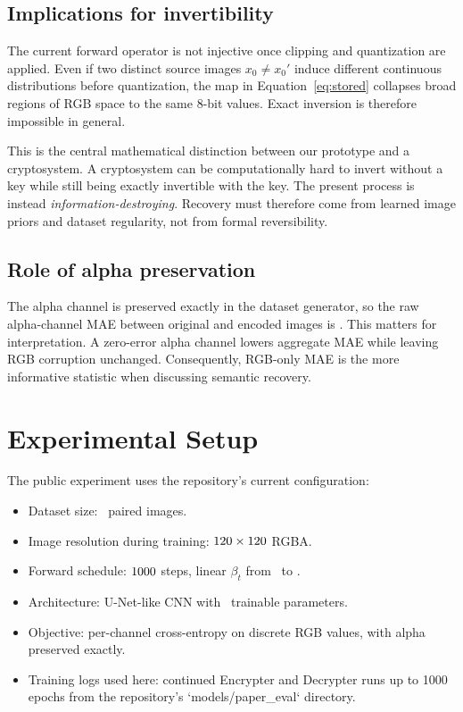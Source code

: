 \documentclass[11pt]{article}
\begin{document}
\subsection{Implications for invertibility}
The current forward operator is not injective once clipping and quantization are applied. Even if two distinct source images $x_0 \neq x_0'$ induce different continuous distributions before quantization, the map in Equation~\eqref{eq:stored} collapses broad regions of RGB space to the same 8-bit values. Exact inversion is therefore impossible in general.

This is the central mathematical distinction between our prototype and a cryptosystem. A cryptosystem can be computationally hard to invert without a key while still being exactly invertible with the key. The present process is instead \emph{information-destroying}. Recovery must therefore come from learned image priors and dataset regularity, not from formal reversibility.

\subsection{Role of alpha preservation}
The alpha channel is preserved exactly in the dataset generator, so the raw alpha-channel MAE between original and encoded images is \RawAlphaMAE. This matters for interpretation. A zero-error alpha channel lowers aggregate MAE while leaving RGB corruption unchanged. Consequently, RGB-only MAE is the more informative statistic when discussing semantic recovery.

\section{Experimental Setup}
The public experiment uses the repository's current configuration:
\begin{itemize}
    \item Dataset size: \NumPairs\ paired images.
    \item Image resolution during training: $120 \times 120$ RGBA.
    \item Forward schedule: $1000$ steps, linear $\beta_t$ from \BetaStart\ to \BetaEnd.
    \item Architecture: U-Net-like CNN with \ModelParamCount\ trainable parameters.
    \item Objective: per-channel cross-entropy on discrete RGB values, with alpha preserved exactly.
    \item Training logs used here: continued Encrypter and Decrypter runs up to 1000 epochs from the repository's `models/paper\_eval` directory.
\end{itemize}
\end{document}
